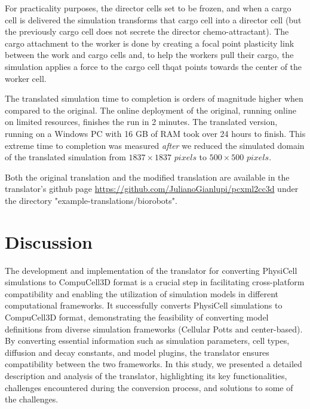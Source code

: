 For practicality purposes, the director cells set to be frozen, and when a cargo cell is delivered the simulation transforms that cargo cell into a director cell (but the previously cargo cell does not secrete the director chemo-attractant). The cargo attachment to the worker is done by creating a focal point plasticity link between the work and cargo cells and, to help the workers pull their cargo, the simulation applies a force to the cargo cell thqat points towards the center of the worker cell.

The translated simulation time to completion is orders of magnitude higher when compared to the original. The online deployment of the original, running online on limited resources, finishes the run in 2 minutes. The translated version, running on a Windows PC with 16 GB of RAM took over 24 hours to finish. This extreme time to completion was measured \textit{after} we reduced the simulated domain of the translated simulation from $1837\times1837\,\,pixels$ to $500\times500\,\,pixels$.

Both the original translation and the modified translation are available in the translator's github page \url{https://github.com/JulianoGianlupi/pcxml2cc3d} under the directory "example\--translations/biorobots".%




\section{Discussion}\label{sec:trans:disc}


The development and implementation of the translator for converting PhysiCell simulations to CompuCell3D format is a crucial step in facilitating cross-platform compatibility and enabling the utilization of simulation models in different computational frameworks. It successfully converts PhysiCell simulations to CompuCell3D format, demonstrating the feasibility of converting model definitions from diverse simulation frameworks (Cellular Potts and center-based). By converting essential information such as simulation parameters, cell types, diffusion and decay constants, and model plugins, the translator ensures compatibility between the two frameworks. In this study, we presented a detailed description and analysis of the translator, highlighting its key functionalities, challenges encountered during the conversion process, and solutions to some of the challenges.



